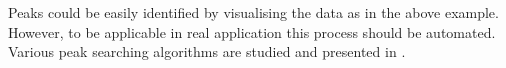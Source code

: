 Peaks could be easily identified by visualising the data as in the above example. However, to be applicable in real application this process should be automated. Various peak searching algorithms are studied and presented in \cite{ventzas2011peak}.



\FloatBarrier


